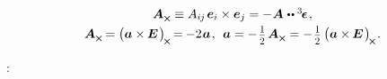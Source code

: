 \nopagebreak\vspace{-0.15em}
\begin{equation}\label{pseudovectorinvariant}
\begin{array}{c}
\bm{A}_{\Xcompanion} \equiv A_{i\hspace{-0.1ex}j} \hspace{.25ex} \bm{e}_i \times \bm{e}_j = - \hspace{.1ex} \bm{A} \hspace{.1ex} \dotdotp \permutationsparitytensor
\hspace{.2ex}, \\[.3em]
%
\bm{A}_{\Xcompanion}
\hspace{-0.16ex} =
\left(^{\mathstrut} \hspace{-0.1ex} \bm{a} \times\hspace{-0.1ex} \UnitDyad \hspace{.2ex} \right)_{\hspace{-0.25ex}\Xcompanion}
\hspace{-0.25ex} = \hspace{-0.12ex}
- 2 \hspace{.16ex} \bm{a} \hspace{.2ex},\:\:
\bm{a}
=
- \hspace{.2ex} \smalldisplaystyleonehalf \hspace{.25ex} \bm{A}_{\Xcompanion}
=
- \hspace{.2ex} \smalldisplaystyleonehalf \left(^{\mathstrut} \hspace{-0.1ex} \bm{a} \times\hspace{-0.1ex} \UnitDyad \hspace{.2ex} \right)_{\hspace{-0.25ex}\Xcompanion}
\hspace{-0.2ex} .
\end{array}
\end{equation}

\textcolor{magenta}{}:

